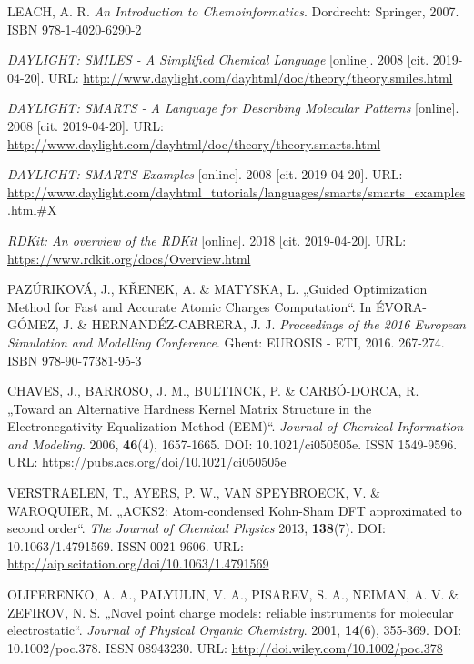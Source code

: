 \begin{thebibliography}{10}
LEACH, A. R. \textit{An Introduction to Chemoinformatics}. Dordrecht: Springer, 2007. ISBN 978-1-4020-6290-2

\textit{DAYLIGHT: SMILES - A Simplified Chemical Language} [online]. 2008 [cit. 2019-04-20]. URL: \url{ http://www.daylight.com/dayhtml/doc/theory/theory.smiles.html}

\textit{DAYLIGHT: SMARTS - A Language for Describing Molecular Patterns} [online]. 2008 [cit. 2019-04-20]. URL: \url{ http://www.daylight.com/dayhtml/doc/theory/theory.smarts.html}

\textit{DAYLIGHT: SMARTS Examples} [online]. 2008 [cit. 2019-04-20]. URL: \url{ http://www.daylight.com/dayhtml_tutorials/languages/smarts/smarts_examples.html#X}

\textit{RDKit: An overview of the RDKit} [online]. 2018 [cit. 2019-04-20]. URL: \url{ https://www.rdkit.org/docs/Overview.html}

PAZÚRIKOVÁ, J., KŘENEK, A. \& MATYSKA, L. „Guided Optimization Method for Fast and Accurate Atomic Charges Computation“. In ÉVORA-GÓMEZ, J. \& HERNANDÉZ-CABRERA, J. J. \textit{Proceedings of the 2016 European Simulation and Modelling Conference}. Ghent: EUROSIS - ETI, 2016. 267-274. ISBN 978-90-77381-95-3

CHAVES, J., BARROSO, J. M., BULTINCK, P. \& CARBÓ-DORCA, R. „Toward an Alternative Hardness Kernel Matrix Structure in the Electronegativity Equalization Method (EEM)“. \textit{Journal of Chemical Information and Modeling}. 2006, \textbf{46}(4), 1657-1665. DOI: 10.1021/ci050505e. ISSN 1549-9596. URL: \url{https://pubs.acs.org/doi/10.1021/ci050505e}

VERSTRAELEN, T., AYERS, P. W., VAN SPEYBROECK, V. \& WAROQUIER, M. „ACKS2: Atom-condensed Kohn-Sham DFT approximated to second order“. \textit{The Journal of Chemical Physics} 2013, \textbf{138}(7). DOI: 10.1063/1.4791569. ISSN 0021-9606. URL: \url{http://aip.scitation.org/doi/10.1063/1.4791569}

OLIFERENKO, A. A., PALYULIN, V. A., PISAREV, S. A., NEIMAN, A. V. \& ZEFIROV, N. S. „Novel point charge models: reliable instruments for molecular electrostatic“. \textit{Journal of Physical Organic Chemistry}. 2001, \textbf{14}(6), 355-369. DOI: 10.1002/poc.378. ISSN 08943230. URL: \url{ http://doi.wiley.com/10.1002/poc.378}


\end{thebibliography}
